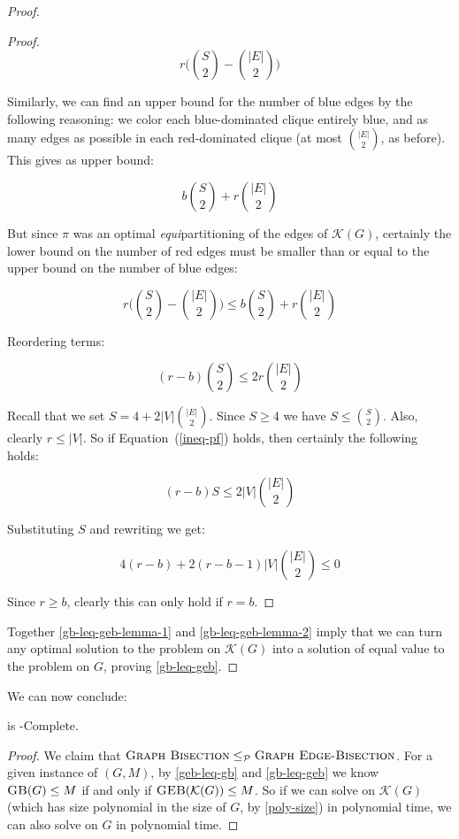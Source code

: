 \begin{proof}
\begin{proof}
			$$r\Big( \binom{S}{2} - \binom{|E|}{2}\Big)$$

			Similarly, we can find an upper bound for the number of blue edges
			by the following reasoning: we color each blue-dominated clique
			entirely blue, and as many edges as possible in each red-dominated
			clique (at most $\binom{|E|}{2}$, as before). This gives as
			upper bound:

			$$b\binom{S}{2} + r\binom{|E|}{2}$$

			But since $\pi$ was an optimal \textit{equi}partitioning of the
			edges of $\mathcal{K}(G)$, certainly the lower bound on the number
			of red edges must be smaller than or equal to the upper bound on
			the number of blue edges:

			$$r\Big( \binom{S}{2} - \binom{|E|}{2}\Big)
				\leq b\binom{S}{2} + r\binom{|E|}{2}$$

			Reordering terms:

			\begin{equation}
				\label{ineq-pf}
				(r-b)\binom{S}{2} \leq 2r\binom{|E|}{2}
			\end{equation}

			Recall that we set $S = 4 + 2|V|\binom{|E|}{2}$. Since $S \geq 4$
			we have $S \leq \binom{S}{2}$. Also, clearly $r \leq |V|$. So if
			Equation~(\ref{ineq-pf}) holds, then certainly the following holds:

			$$(r-b)S \leq 2|V|\binom{|E|}{2}$$

			Substituting $S$ and rewriting we get:

			$$4(r-b) + 2(r-b-1)|V|\binom{|E|}{2} \leq 0$$
 
			Since $r \geq b$, clearly this can only hold if $r=b$.
		\end{proof}

		Together \autoref{gb-leq-geb-lemma-1} and \autoref{gb-leq-geb-lemma-2}
		imply that we can turn any optimal solution to the \geb problem on
		$\mathcal{K}(G)$ into a solution of equal value to the \gb problem on
		$G$, proving \autoref{gb-leq-geb}.
	\end{proof}

	We can now conclude:

	\begin{theorem}
		\geb is \NP-Complete.
	\end{theorem}
	\begin{proof}
		We claim that $\textsc{Graph \allowbreak Bisection} \leq_{\mathcal{P}} \textsc{Graph \allowbreak Edge-\allowbreak Bisection}$.
		For a given instance of \gb $(G, M)$, by \autoref{geb-leq-gb} and
		\autoref{gb-leq-geb} we know
		$\textsc{GB}(G) \leq M$ if and only if $\textsc{GEB}(\mathcal{K}(G)) \leq M$. So
		if we can solve \geb on $\mathcal{K}(G)$ (which has size polynomial
		in the size of $G$, by \autoref{poly-size}) in polynomial time, we can
		also solve \gb on $G$ in polynomial time.
	\end{proof}

